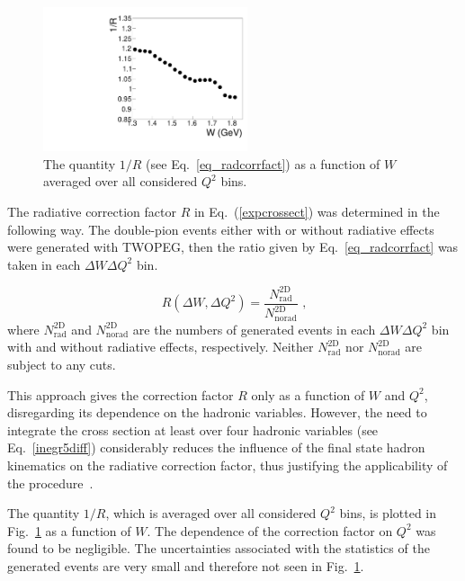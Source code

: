 \documentclass[prc,twocolumn,superscriptaddress,showpacs,amssymb,amsmath,amsfonts,aps,nofootinbib]{revtex4-1}
\begin{document}
\begin{figure}[htp]
\begin{center}
\includegraphics[width=6cm]{pictures/rad_corr/rad_corr_avrg.pdf}
\caption{\small The quantity $1/R$ (see Eq.~\eqref{eq_radcorrfact})
as a function of $W$ averaged over all considered $Q^{2}$ bins.} \label{radcorrfact}
\end{center}
\end{figure}


The radiative
correction factor $R$ in Eq.~(\ref{expcrossect})
was determined in the following way.
The double-pion events either with or without radiative effects were generated with TWOPEG, then the ratio given by Eq.~\eqref{eq_radcorrfact} was taken in each $\Delta W \Delta Q^{2}$ bin. 

\begin{equation}
\label{eq_radcorrfact}
R(\Delta W,\Delta Q^{2}) = \frac{N_{\text{rad}}^{\text{2D}}}{N_{\text{norad}}^{\text{2D}}} \textrm{ ,}
\end{equation}
where $N_{\text{rad}}^{\text{2D}}$ and $N_{\text{norad}}^{\text{2D}}$ are the
numbers of generated events in each $\Delta W \Delta Q^{2}$ bin
with and without radiative effects, respectively. Neither $N_{\text{rad}}^{\text{2D}}$ nor $N_{\text{norad}}^{\text{2D}}$ are subject to any cuts.



This approach gives the correction factor $R$ only as a function of $W$ and $Q^{2}$, disregarding its dependence on the hadronic variables.
However, 
the need to integrate the cross section at least over four hadronic variables (see Eq.~\eqref{inegr5diff}) considerably reduces the influence of
the final state hadron kinematics on the
radiative correction factor, thus justifying 
the applicability of the procedure~\cite{Mo:1968cg,Skorodum:EG}.




 The quantity $1/R$, which is averaged over all considered $Q^{2}$ bins, is plotted in  Fig.~\ref{radcorrfact} as a function of $W$. The dependence of the correction factor on $Q^{2}$ was found to be negligible.  The uncertainties associated with the statistics of the generated events are very small and therefore  not seen in Fig.~\ref{radcorrfact}.
\end{document}
